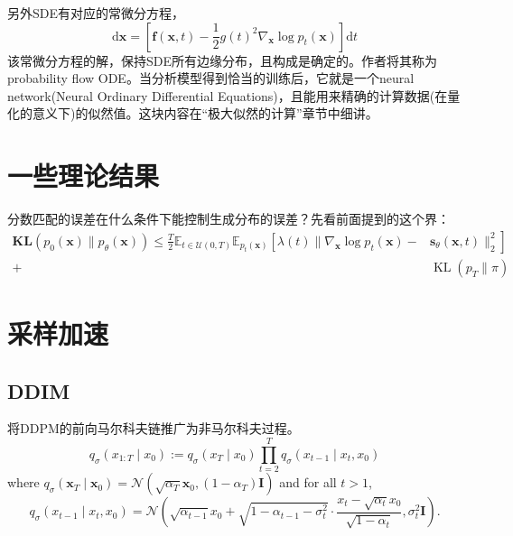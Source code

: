另外SDE有对应的常微分方程，
\begin{equation}
\mathrm{d} \mathbf{x}=\left[\mathbf{f}(\mathbf{x}, t)-\frac{1}{2} g(t)^2 \nabla_{\mathbf{x}} \log p_t(\mathbf{x})\right] \mathrm{d} t
\end{equation}
该常微分方程的解，保持SDE所有边缘分布，且构成是确定的。作者将其称为probability flow ODE。当分析模型得到恰当的训练后，它就是一个neural network(Neural Ordinary Differential Equations)，且能用来精确的计算数据(在量化的意义下)的似然值。这块内容在“极大似然的计算”章节中细讲。







\section{一些理论结果}
分数匹配的误差在什么条件下能控制生成分布的误差？先看前面提到的这个界：
\begin{equation}
  \begin{aligned} \mathbf{KL}\left(p_0(\mathbf{x}) \| p_\theta(\mathbf{x})\right) \leq \frac{T}{2} \mathbb{E}_{t \in \mathcal{U}(0, T)} \mathbb{E}_{p_t(\mathbf{x})}\left[\lambda(t) \| \nabla_{\mathbf{x}} \log p_t(\mathbf{x})-\right. 
    & \left.\mathbf{s}_\theta(\mathbf{x}, t) \|_2^2\right] \\ + 
    & \operatorname{KL}\left(p_T \| \pi\right)
  \end{aligned}
\end{equation}



\section{采样加速}
\subsection{DDIM}



将DDPM的前向马尔科夫链推广为非马尔科夫过程。
$$
q_\sigma\left(x_{1: T} \mid x_0\right):=q_\sigma\left(x_T \mid x_0\right) \prod_{t=2}^T q_\sigma\left(x_{t-1} \mid x_t, x_0\right)
$$
where $q_\sigma\left(\boldsymbol{x}_T \mid \boldsymbol{x}_0\right)=\mathcal{N}\left(\sqrt{\alpha_T} \boldsymbol{x}_0,\left(1-\alpha_T\right) \boldsymbol{I}\right)$ and for all $t>1$,
$$
q_\sigma\left(x_{t-1} \mid x_t, x_0\right)=\mathcal{N}\left(\sqrt{\alpha_{t-1}} x_0+\sqrt{1-\alpha_{t-1}-\sigma_t^2} \cdot \frac{x_t-\sqrt{\alpha_t} x_0}{\sqrt{1-\alpha_t}}, \sigma_t^2 \boldsymbol{I}\right) .
$$

